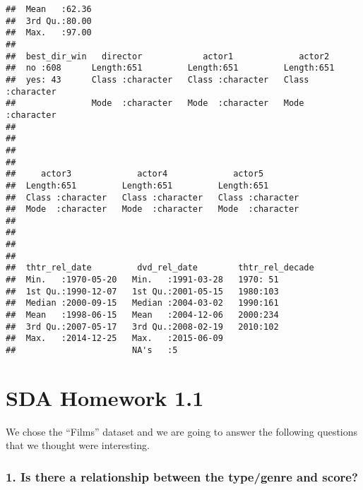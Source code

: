 \documentclass[]{article}
\begin{document}
\begin{verbatim}
##  Mean   :62.36                                                            
##  3rd Qu.:80.00                                                            
##  Max.   :97.00                                                            
##                                                                           
##  best_dir_win   director            actor1             actor2         
##  no :608      Length:651         Length:651         Length:651        
##  yes: 43      Class :character   Class :character   Class :character  
##               Mode  :character   Mode  :character   Mode  :character  
##                                                                       
##                                                                       
##                                                                       
##                                                                       
##     actor3             actor4             actor5         
##  Length:651         Length:651         Length:651        
##  Class :character   Class :character   Class :character  
##  Mode  :character   Mode  :character   Mode  :character  
##                                                          
##                                                          
##                                                          
##                                                          
##  thtr_rel_date         dvd_rel_date        thtr_rel_decade
##  Min.   :1970-05-20   Min.   :1991-03-28   1970: 51       
##  1st Qu.:1990-12-07   1st Qu.:2001-05-15   1980:103       
##  Median :2000-09-15   Median :2004-03-02   1990:161       
##  Mean   :1998-06-15   Mean   :2004-12-06   2000:234       
##  3rd Qu.:2007-05-17   3rd Qu.:2008-02-19   2010:102       
##  Max.   :2014-12-25   Max.   :2015-06-09                  
##                       NA's   :5
\end{verbatim}

\hypertarget{sda-homework-1.1}{%
\section{SDA Homework 1.1}\label{sda-homework-1.1}}

We chose the ``Films'' dataset and we are going to answer the following
questions that we thought were interesting.

\hypertarget{is-there-a-relationship-between-the-typegenre-and-score}{%
\subsubsection{1. Is there a relationship between the type/genre and
score?}\label{is-there-a-relationship-between-the-typegenre-and-score}}
\end{document}
